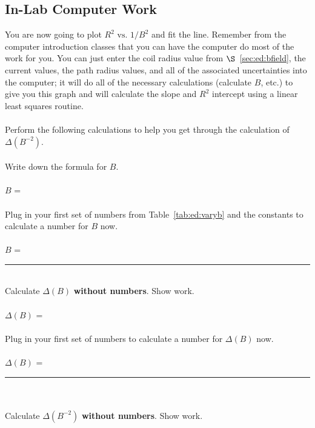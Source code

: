 \subsection{In-Lab Computer Work}
You are now going to plot $R^2 \mbox{ vs. } 1/B^2$ and fit the line.  
Remember from the computer 
introduction classes that you can have the computer do most of the work
for you.  You can just enter the coil radius value 
from $\S$~\ref{sec:ed:bfield}, the current values, the path radius values, and 
all of the associated uncertainties into the computer; it will do all of the 
necessary calculations (calculate $B$, etc.) to give you this graph and will 
calculate the slope and $R^2$ intercept using a linear least squares routine.\\
\ \\
  Perform 
the following calculations to help you get through the calculation of 
$\Delta(B^{-2})$. \\
\ \\
\noindent Write down the formula for $B$. \\
\vspace*{1cm} \\
\hspace*{5cm} $B$ = \\
\ \\
\noindent Plug in your first set of numbers from Table~\ref{tab:ed:varyb} 
and the constants to calculate a number for $B$ now. \\
\vspace*{1cm} \\           
\hspace*{5cm} $B$ =~\rule{3cm}{.1mm}\\ 
\noindent Calculate $\Delta(B)$ {\bf without numbers}. Show work. \\
\vspace*{3cm} \\
\hspace*{5cm} $\Delta(B)$ = \\
\ \\
\noindent Plug in your first set of numbers to calculate a  number for 
$\Delta(B)$ now.\\
\vspace*{1cm} \\
\hspace*{5cm} $\Delta(B)$ =~\rule{3cm}{.1mm} \\
\ \\
\noindent Calculate $\Delta(B^{-2})$ {\bf without numbers}. Show work.
